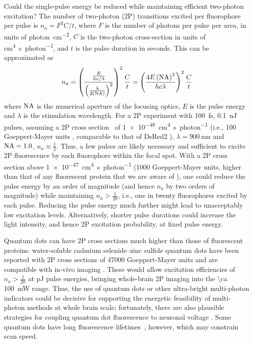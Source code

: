 Could the single-pulse energy be reduced while maintaining efficient two-photon excitation? The number of two-photon (2P) transitions excited per fluorophore per pulse is $n_a = F^2 C / t$, where $F$ is the number of photons per pulse per area, in units of \si{photon\per\centi\meter\squared}, $C$ is the two-photon cross-section in units of \si{\centi\meter\tothe{4}\second\per photon}, and $t$ is the pulse duration in seconds.
This can be approximated as
\[n_a = \left(\frac{\frac{E}{h c / \lambda}}{\left(\frac{\lambda}{2 \left(\text{NA}\right)}\right)^2}\right)^2 \frac{C}{t} = \left(\frac{4E\left(\text{NA}\right)^2}{h c \lambda}\right)^2 \frac{C}{t}\]
where $\text{NA}$ is the numerical aperture of the focusing optics, $E$ is the pulse energy and $\lambda$ is the stimulation wavelength.
For a 2P experiment with \SI{100}{\femto\second}, \SI{0.1}{\nano\joule} pulses, assuming a 2P cross section~\cite{masters06, drobizhev2011} of \SI{1e-48}{\centi\meter\tothe{4}\second\per photon} (i.e., 100 Goeppert-Mayer units \cite{Goeppert-Mayer1931}, comparable to that of DsRed2 \cite{drobizhev2011}), $\lambda=\SI{900}{\nano\meter}$ and $\text{NA}=1.0$, $n_a \approx \frac{1}{2}$.
Thus, a few pulses are likely necessary and sufficient to excite 2P fluorescence by each fluorophore within the focal spot. With a 2P cross section above \SI{1e-47}{\centi\meter\tothe{4}\second\per photon} (1000 Goeppert-Mayer units, higher than that of any fluorescent protein that we are aware of \cite{drobizhev2011}), one could reduce the pulse energy by an order of magnitude (and hence $n_a$ by two orders of magnitude) while maintaining $n_a > \frac{1}{20}$, i.e., one in twenty fluorophores excited by each pulse. Reducing the pulse energy much further might lead to unacceptably low excitation levels. Alternatively, shorter pulse durations could increase the light intensity, and hence 2P excitation probability, at fixed pulse energy. 

Quantum dots can have 2P cross sections much higher than those of fluorescent proteins:  water-soluble cadmium selenide–zinc sulfide quantum dots have been reported with 2P cross sections of 47000 Goeppert-Mayer units and are compatible with in-vivo imaging \cite{Larson30052003}. These would allow excitation efficiencies of $n_a > \frac{1}{20}$ at \si{\pico\joule} pulse energies, bringing whole-brain 2P imaging into the \SI{\ca 100}{\milli\watt} range. Thus, the use of quantum dots or other ultra-bright multi-photon indicators could be decisive for supporting the energetic feasibility of multi-photon methods at whole brain scale; fortunately, there are also plausible strategies for coupling quantum dot fluorescence to neuronal voltage \cite{Marshall2013}. Some quantum dots have long fluorescence lifetimes~\cite{Dahan2001}, however, which may constrain scan speed.


